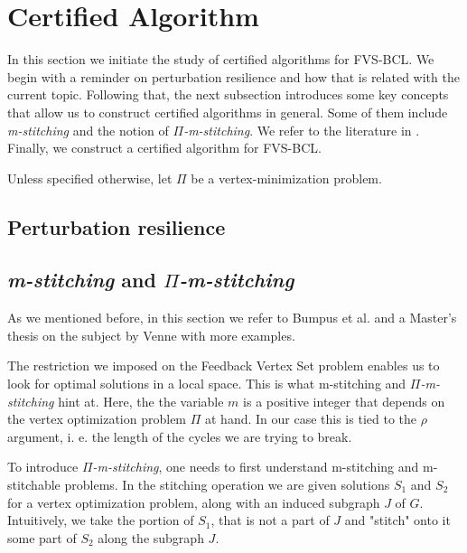 \section{Certified Algorithm}

\noindent In this section we initiate the study of certified algorithms for FVS-BCL. We 
begin with a reminder on perturbation resilience and how that is related with the current 
topic. Following that, the next subsection introduces some key concepts that allow us 
to construct certified algorithms in general. Some of them include \textit{m-stitching} 
and the notion of \textit{$\Pi$-m-stitching}. We refer to the literature 
in \cite{bumpus_et_al:LIPIcs.SWAT.2024.19, venne2022designing}. Finally, we construct 
a certified algorithm for FVS-BCL.

\noindent Unless specified otherwise, let $\Pi$ be a vertex-minimization problem.

\subsection{Perturbation resilience}

\subsection{\textit{m-stitching} and \textit{$\Pi$-m-stitching}}

\noindent As we mentioned before, in this section we refer to Bumpus et al. \cite{bumpus_et_al:LIPIcs.SWAT.2024.19} 
and a Master's thesis on the subject by Venne \cite{venne2022designing} with more examples. 

\noindent The restriction we imposed on the Feedback Vertex Set problem enables us to look 
for optimal solutions in a local space. This is what m-stitching and \textit{$\Pi$-m-stitching}
hint at. Here, the the variable $m$ is a positive integer that depends on the vertex optimization 
problem $\Pi$ at hand. In our case this is tied to the $\rho$ argument, i. e. the length of 
the cycles we are trying to break. 

\noindent To introduce \textit{$\Pi$-m-stitching}, one needs to first understand m-stitching and m-stitchable problems. In the stitching 
operation we are given solutions $S_1$ and $S_2$ for a vertex optimization problem, 
along with an induced subgraph $J$ of $G$. Intuitively, we take the portion of $S_1$, that is not a part 
of $J$ and "stitch" onto it some part of $S_2$ along the subgraph $J$. 


